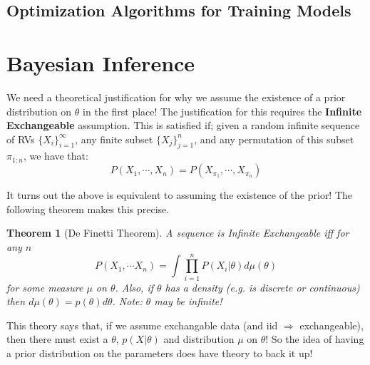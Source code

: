 \documentclass[]{article}
\theoremstyle{mattstyle}
\newtheorem{theorem}{Theorem}[section]
\theoremstyle{definition}
\begin{document}
\newpage

\subsection{Optimization Algorithms for Training Models}

\newpage

\section{Bayesian Inference}
We need a theoretical justification for why we assume the existence of a prior distribution on \(\theta\) in the first place! The justification for this requires the \textbf{Infinite Exchangeable} assumption. This is satisfied if; given a random infinite sequence of RVs \( \{X_i\}_{i=1}^{\infty}\), any finite subset \(\{X_j\}_{j=1}^{n}\), and any permutation of this subset \(\pi_{1:n}\), we have that:
\begin{equation}
P(X_1, \cdots, X_n) = P(X_{\pi_1}, \cdots, X_{\pi_n})
\end{equation}

It turns out the above is equivalent to assuming the existence of the prior! The following theorem makes this precise.

\begin{theorem}[De Finetti Theorem]
	A sequence is Infinite Exchangeable iff for any \(n\)
	$$ P(X_1, \cdots X_n) = \int\prod_{i=1}^n P(X_i|\theta)d\mu(\theta) $$
	for some measure \(\mu\) on \(\theta\). Also, if $\theta$ has a density (e.g. is discrete or continuous) then $d\mu(\theta) = p(\theta)d\theta$. Note: \(\theta\) may be infinite!
\end{theorem}

This theory says that, if we assume exchangable data (and iid $\Rightarrow$ exchangeable), then there must exist a \(\theta\), \(p(X|\theta)\) and distribution \(\mu\) on \(\theta\)! So the idea of having a prior distribution on the parameters does have theory to back it up!


\newpage



\end{document}
